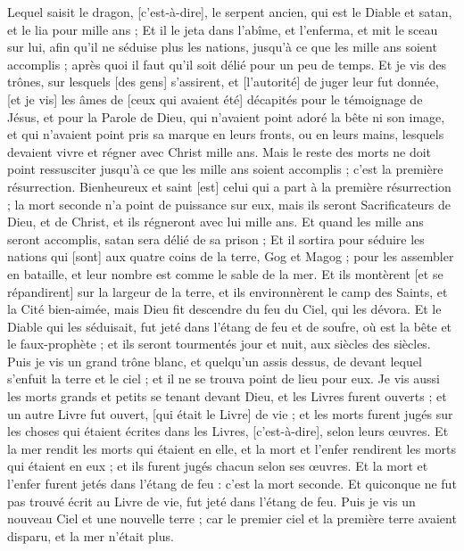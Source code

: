 \begin{multicols}{2}
Lequel saisit le dragon, [c'est-à-dire], le serpent ancien, qui est le Diable et satan, et le lia pour mille ans ;
Et il le jeta dans l'abîme, et l'enferma, et mit le sceau sur lui, afin qu'il ne séduise plus les nations, jusqu'à ce que les mille ans soient accomplis ; après quoi il faut qu'il soit délié pour un peu de temps.
Et je vis des trônes, sur lesquels [des gens] s'assirent, et [l'autorité] de juger leur fut donnée, [et je vis] les âmes de [ceux qui avaient été] décapités pour le témoignage de Jésus, et pour la Parole de Dieu, qui n'avaient point adoré la bête ni son image, et qui n'avaient point pris sa marque en leurs fronts, ou en leurs mains, lesquels devaient vivre et régner avec Christ mille ans.
Mais le reste des morts ne doit point ressusciter jusqu'à ce que les mille ans soient accomplis ; c'est la première résurrection.
Bienheureux et saint [est] celui qui a part à la première résurrection ; la mort seconde n'a point de puissance sur eux, mais ils seront Sacrificateurs de Dieu, et de Christ, et ils régneront avec lui mille ans.
Et quand les mille ans seront accomplis, satan sera délié de sa prison ;
Et il sortira pour séduire les nations qui [sont] aux quatre coins de la terre, Gog et Magog ; pour les assembler en bataille, et leur nombre est comme le sable de la mer.
Et ils montèrent [et se répandirent] sur la largeur de la terre, et ils environnèrent le camp des Saints, et la Cité bien-aimée, mais Dieu fit descendre du feu du Ciel, qui les dévora.
Et le Diable qui les séduisait, fut jeté dans l'étang de feu et de soufre, où est la bête et le faux-prophète ; et ils seront tourmentés jour et nuit, aux siècles des siècles.
Puis je vis un grand trône blanc, et quelqu'un assis dessus, de devant lequel s’enfuit la terre et le ciel ; et il ne se trouva point de lieu pour eux.
Je vis aussi les morts grands et petits se tenant devant Dieu, et les Livres furent ouverts ; et un autre Livre fut ouvert, [qui était le Livre] de vie ; et les morts furent jugés sur les choses qui étaient écrites dans les Livres, [c'est-à-dire], selon leurs œuvres.
Et la mer rendit les morts qui étaient en elle, et la mort et l'enfer rendirent les morts qui étaient en eux ; et ils furent jugés chacun selon ses œuvres.
Et la mort et l'enfer furent jetés dans l'étang de feu : c'est la mort seconde.
Et quiconque ne fut pas trouvé écrit au Livre de vie, fut jeté dans l'étang de feu.
\VerseOne{}Puis je vis un nouveau Ciel et une nouvelle terre ; car le premier ciel et la première terre avaient disparu, et la mer n'était plus.

\end{multicols}
